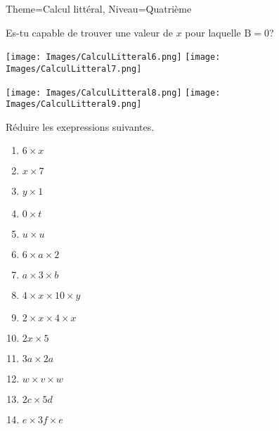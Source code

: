 \documentclass[11pt]{article}
\begin{document}
\begin{multicols}{2}
\begin{Maquette}[Fiche]{Theme=Calcul littéral, Niveau=Quatrième}
\begin{exercice}
    Es-tu capable de trouver une valeur de $x$ pour laquelle $\textrm{B}=0$?
\end{exercice}

\columnbreak

\begin{exercice}
    \texttt{[image: Images/CalculLitteral6.png]}
    \texttt{[image: Images/CalculLitteral7.png]}
\end{exercice}

\begin{exercice}
    \texttt{[image: Images/CalculLitteral8.png]}
    \texttt{[image: Images/CalculLitteral9.png]}
\end{exercice}

\begin{exercice}
    Réduire les exepressions suivantes.
    \begin{multicols}{2}
        \begin{enumerate}[label=\textbf{\alph*.}]
        \item $6\times x$
        \item $x \times 7$
        \item $y \times 1$
        \item $0 \times t$
        \item $u \times u$
        \item $6\times a \times 2$
        \item $a \times 3 \times b$
        \item $4\times x \times 10\times y$
        \item $2\times x \times 4 \times x$
        \item $2x\times 5$
        \item $3a \times 2a$
        \item $w \times v \times w$
        \item $2c \times 5d$
        \item $e \times 3f \times e$
    \end{enumerate}
    \end{multicols}
\end{exercice}


\end{Maquette}
\end{multicols}
\end{document}
